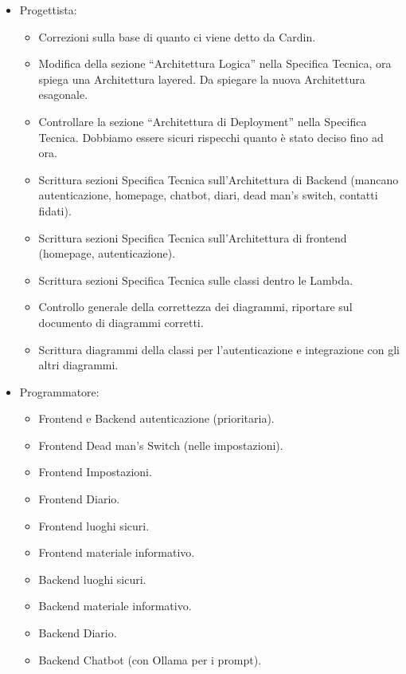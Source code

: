 \documentclass[a4paper,12pt]{article}
\begin{document}
\begin{itemize}
\begin{itemize}
\begin{itemize}
        \item Redazione riassunto di periodo dello Sprint 10 nel PdP.
    \end{itemize}
    \item Progettista:
    \begin{itemize}
        \item Correzioni sulla base di quanto ci viene detto da Cardin.
        \item Modifica della sezione “Architettura Logica” nella Specifica Tecnica, ora spiega una Architettura layered. Da spiegare la nuova Architettura esagonale.
        \item Controllare la sezione “Architettura di Deployment” nella Specifica Tecnica. Dobbiamo essere sicuri rispecchi quanto è stato deciso fino ad ora.
        \item Scrittura sezioni Specifica Tecnica sull’Architettura di Backend (mancano autenticazione, homepage, chatbot, diari, dead man’s switch, contatti fidati).
        \item Scrittura sezioni Specifica Tecnica sull’Architettura di frontend (homepage, autenticazione).
        \item Scrittura sezioni Specifica Tecnica sulle classi dentro le Lambda.
        \item Controllo generale della correttezza dei diagrammi, riportare sul documento di diagrammi corretti.
        \item Scrittura diagrammi della classi per l’autenticazione e integrazione con gli altri diagrammi.
    \end{itemize}
    \item Programmatore:
    \begin{itemize}
        \item Frontend e Backend autenticazione (prioritaria).
        \item Frontend Dead man’s Switch (nelle impostazioni).
        \item Frontend Impostazioni.
        \item Frontend Diario.
        \item Frontend luoghi sicuri.
        \item Frontend materiale informativo.
        \item Backend luoghi sicuri.
        \item Backend materiale informativo.
        \item Backend Diario.
        \item Backend Chatbot (con Ollama per i prompt).

\end{itemize}
\end{itemize}
\end{itemize}
\end{document}
